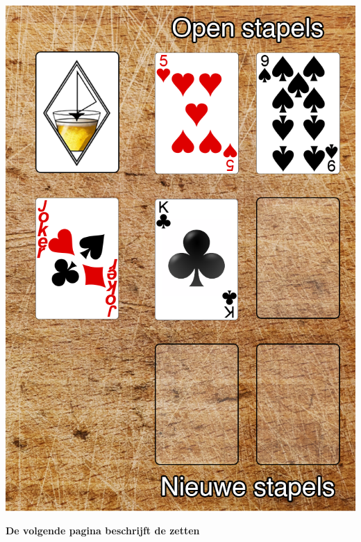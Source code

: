 \begin{minipage}[t]{.48\textwidth}
\includegraphics[width=.96\textwidth]{img/Frits_plank_v4_2.png}
\end{minipage}

\vspace{+0.8cm}

\centerline{\Large{\textbf{De volgende pagina beschrijft de zetten}}}